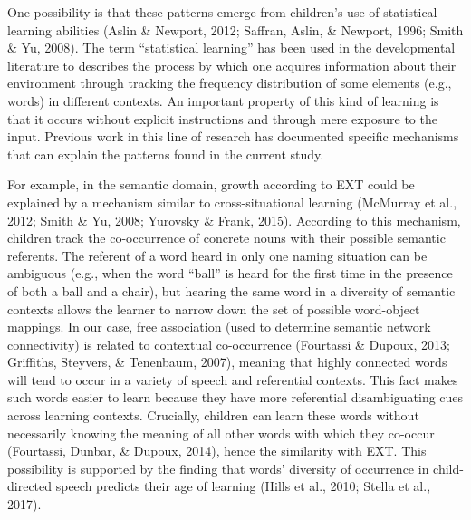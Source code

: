 \documentclass[english,,man,floatsintext]{apa6}
\begin{document}
One possibility is that these patterns emerge from children's use of statistical learning abilities (Aslin \& Newport, 2012; Saffran, Aslin, \& Newport, 1996; Smith \& Yu, 2008). The term \enquote{statistical learning} has been used in the developmental literature to describes the process by which one acquires information about their environment through tracking the frequency distribution of some elements (e.g., words) in different contexts. An important property of this kind of learning is that it occurs without explicit instructions and through mere exposure to the input. Previous work in this line of research has documented specific mechanisms that can explain the patterns found in the current study.

For example, in the semantic domain, growth according to EXT could be explained by a mechanism similar to cross-situational learning (McMurray et al., 2012; Smith \& Yu, 2008; Yurovsky \& Frank, 2015). According to this mechanism, children track the co-occurrence of concrete nouns with their possible semantic referents. The referent of a word heard in only one naming situation can be ambiguous (e.g., when the word \enquote{ball} is heard for the first time in the presence of both a ball and a chair), but hearing the same word in a diversity of semantic contexts allows the learner to narrow down the set of possible word-object mappings. In our case, free association (used to determine semantic network connectivity) is related to contextual co-occurrence (Fourtassi \& Dupoux, 2013; Griffiths, Steyvers, \& Tenenbaum, 2007), meaning that highly connected words will tend to occur in a variety of speech and referential contexts. This fact makes such words easier to learn because they have more referential disambiguating cues across learning contexts. Crucially, children can learn these words without necessarily knowing the meaning of all other words with which they co-occur (Fourtassi, Dunbar, \& Dupoux, 2014), hence the similarity with EXT. This possibility is supported by the finding that words' diversity of occurrence in child-directed speech predicts their age of learning (Hills et al., 2010; Stella et al., 2017).
\end{document}
